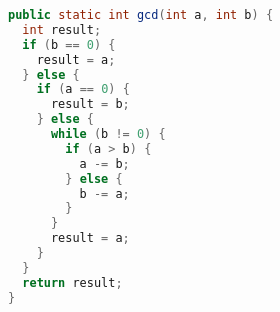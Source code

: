 \begin{lstlisting}[language=Java]
public static int gcd(int a, int b) {
  int result;
  if (b == 0) {
    result = a;
  } else {
    if (a == 0) {
      result = b;
    } else {
      while (b != 0) {
        if (a > b) {
          a -= b;
        } else {
          b -= a;
        }
      }
      result = a;
    }
  }
  return result;
}
\end{lstlisting}